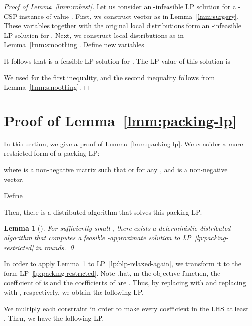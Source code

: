 \documentclass[letterpaper, 11pt]{article}
\newtheorem{lemma}[theorem]{Lemma}
\begin{document}
\begin{proof}[Proof of Lemma~\ref{lmm:robust}]
  Let us consider an -infeasible LP solution  for a -CSP instance  of value .
  First, we construct vector  as in Lemma~\ref{lmm:surgery}.
  These variables together with the original local distributions  form an -infeasible LP solution for .
  Next, we construct local distributions  as in Lemma~\ref{lmm:smoothing}.
  Define new variables
  
  It follows that  is a feasible LP solution for .
  The LP value of this solution is
  
  We used  for the first inequality, and the second inequality follows from Lemma~\ref{lmm:smoothing}.
\end{proof}

\section{Proof of Lemma~\ref{lmm:packing-lp}}\label{sec:packing-lp}
In this section, we give a proof of Lemma~\ref{lmm:packing-lp}.
We consider a more restricted form of a packing LP:

where  is a non-negative matrix such that  or  for any ,
and  is a non-negative vector.

Define

Then, there is a distributed algorithm that solves this packing LP.
\begin{lemma}[\cite{KMW06}]\label{lmm:kmw06}
  For sufficiently small ,
  there exists a deterministic distributed algorithm that computes a feasible -approximate solution to LP~\eqref{lp:packing-restricted} in  rounds.
  \qed
\end{lemma}

In order to apply Lemma~\ref{lmm:kmw06} to LP~\eqref{lp:blp-relaxed-again},
we transform it to the form LP~\eqref{lp:packing-restricted}.
Note that, in the objective function,
the coefficient of  is  and the coefficients of  are .
Thus, by replacing  with  and replacing  with , respectively, we obtain the following LP.


We multiply each constraint in order to make every coefficient in the LHS at least .
Then, we have the following LP.
\end{document}
